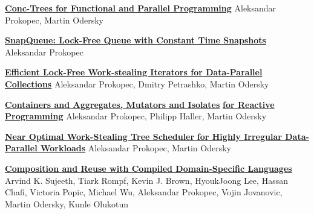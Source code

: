 \documentclass[9pt]{article}
\begin{document}
\noindent\href{http://axel22.github.io/resources/docs/lcpc-conc-trees.pdf}
{\bf Conc-Trees for Functional and Parallel Programming}
\newline\noindent Aleksandar Prokopec, Martin Odersky
\newline
{}
\medskip

\noindent\href{http://axel22.github.io/resources/docs/snapqueue.pdf}
{\bf SnapQueue: Lock-Free Queue with Constant Time Snapshots}
\newline
\noindent Aleksandar Prokopec
\newline
{}
\bigskip

\noindent\href{http://axel22.github.io/resources/docs/pdp.pdf}
{\bf Efficient Lock-Free Work-stealing Iterators for Data-Parallel Collections}
\newline
\noindent Aleksandar Prokopec, Dmitry Petrashko, Martin Odersky
\newline
{}
\bigskip

\noindent\href{http://axel22.github.io/resources/docs/reactives-and-isolates.pdf}
{\bf Containers and Aggregates, Mutators and Isolates}
\newline
\noindent\href{http://axel22.github.io/resources/docs/reactives-and-isolates.pdf}
{\bf for Reactive Programming}
\newline
\noindent Aleksandar Prokopec, Philipp Haller, Martin Odersky
\newline
{}
\bigskip

\noindent\href{http://axel22.github.io/resources/docs/lcpc2013_submission_6.pdf}
{\bf Near Optimal Work-Stealing Tree Scheduler }
\newline
\noindent\href{http://axel22.github.io/resources/docs/lcpc2013_submission_6.pdf}
{\bf for Highly Irregular Data-Parallel Workloads}
\newline
\noindent Aleksandar Prokopec, Martin Odersky
\newline
{}
\bigskip

\noindent\href{http://axel22.github.io/resources/docs/ecoop13_sujeeth.pdf}
{\bf Composition and Reuse with Compiled Domain-Specific Languages}
\newline
\noindent Arvind K. Sujeeth, Tiark Rompf, Kevin J. Brown,
\newline
\noindent HyoukJoong Lee,
          Hassan Chafi, Victoria Popic, Michael Wu,
\newline
\noindent Aleksandar Prokopec,
          Vojin Jovanovic, Martin Odersky, Kunle Olukotun
\newline
{}
\bigskip
\end{document}
